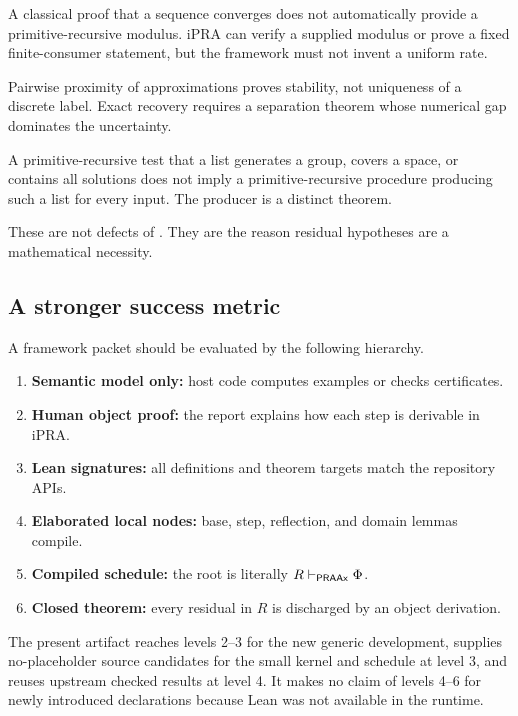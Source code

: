 \begin{obstruction}
A classical proof that a sequence converges does not automatically provide a primitive-recursive
modulus.  iPRA can verify a supplied modulus or prove a fixed finite-consumer statement, but the
framework must not invent a uniform rate.
\end{obstruction}

\begin{obstruction}
Pairwise proximity of approximations proves stability, not uniqueness of a discrete label.  Exact
recovery requires a separation theorem whose numerical gap dominates the uncertainty.
\end{obstruction}

\begin{obstruction}
A primitive-recursive test that a list generates a group, covers a space, or contains all solutions
does not imply a primitive-recursive procedure producing such a list for every input.  The producer
is a distinct theorem.
\end{obstruction}

These are not defects of \TAPIR{}.  They are the reason residual hypotheses are a mathematical
necessity.

\subsection{A stronger success metric}

A framework packet should be evaluated by the following hierarchy.

\begin{enumerate}
\item \textbf{Semantic model only:} host code computes examples or checks certificates.
\item \textbf{Human object proof:} the report explains how each step is derivable in iPRA.
\item \textbf{Lean signatures:} all definitions and theorem targets match the repository APIs.
\item \textbf{Elaborated local nodes:} base, step, reflection, and domain lemmas compile.
\item \textbf{Compiled schedule:} the root is literally \(R\vdash_{\mathsf{PRAAx}}\Phi\).
\item \textbf{Closed theorem:} every residual in \(R\) is discharged by an object derivation.
\end{enumerate}

The present artifact reaches levels 2--3 for the new generic development, supplies no-placeholder
source candidates for the small kernel and schedule at level 3, and reuses upstream checked results
at level 4.  It makes no claim of levels 4--6 for newly introduced declarations because Lean was not
available in the runtime.
